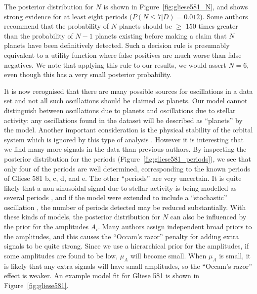\documentclass[useAMS,usenatbib]{mn2e}
\begin{document}
The posterior distribution for $N$ is shown in Figure~\ref{fig:gliese581_N},
and shows strong evidence for at least eight periods
($P(N \leq 7 | D) = 0.012$). Some authors \citep[e.g.][]{2011A&A...528L...5T}
recommend that the probability of $N$ planets should be $\geq$ 150 times
greater than the probability of $N-1$ planets existing before making a
claim that $N$ planets have been definitively detected. Such a decision rule
is presumably equivalent to a utility function where false positives are much
worse than false negatives. We note that applying this rule to our results, we
would assert $N=6$, even though this has a very small posterior probability.

It is now recognised that
there are many possible sources for oscillations in a data set and not all
such oscillations should be claimed as planets. 
Our model cannot distinguish between oscillations due to planets and
oscillations due to stellar activity: any oscillations found in the dataset
will be described as ``planets'' by the model. Another important consideration
is the physical stability of the orbital system which is ignored by this type
of analysis \citep{orbital}. However it is interesting that
we find many more signals in the data than previous authors.
By inspecting the posterior distribution for the periods
(Figure~\ref{fig:gliese581_periods}), we see that only four of the periods
are well determined, corresponding to the known periods of Gliese 581 b, c, d,
and e. The other ``periods'' are very uncertain. It is quite likely that a
non-sinusoidal signal due to stellar activity is being modelled as several
periods \citep{astero}, and if the model were extended to include a ``stochastic''
oscillation \citep{gaussproc}, the number of periods detected may be reduced
substantially. With these kinds of models, the posterior distribution for $N$
can also be influenced by the prior for the amplitudes $A_i$. Many authors
assign independent broad priors to the amplitudes, and this causes the
``Occam's razor'' penalty for adding extra signals to be quite strong. Since we
use a hierarchical prior for the amplitudes, if some amplitudes are found to
be low, $\mu_A$ will become small. When $\mu_A$ is small, it is likely that any
extra signals will have small amplitudes, so the ``Occam's razor'' effect is
weaker. An example model fit for Gliese 581 is shown in
Figure~\ref{fig:gliese581}.
\end{document}
